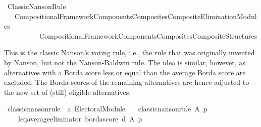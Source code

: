 %
\begin{isabellebody}%
%
%
\isadelimdocument
\isanewline
%
\endisadelimdocument
%
\isatagdocument
\isanewline
%
\isamarkuptrue%
%
\endisatagdocument
{\isafolddocument}%
%
\isadelimdocument
%
\endisadelimdocument
%
\isadelimtheory
%
\endisadelimtheory
%
\isatagtheory
{}\isamarkupfalse%
\ Classic{\isacharunderscore}{\kern0pt}Nanson{\isacharunderscore}{\kern0pt}Rule\isanewline
\ \ \ {\isachardoublequoteopen}{\isachardot}{\kern0pt}{\isachardot}{\kern0pt}{\isacharslash}{\kern0pt}Compositional{\isacharunderscore}{\kern0pt}Framework{\isacharslash}{\kern0pt}Components{\isacharslash}{\kern0pt}Composites{\isacharslash}{\kern0pt}Composite{\isacharunderscore}{\kern0pt}Elimination{\isacharunderscore}{\kern0pt}Modules{\isachardoublequoteclose}\isanewline
\ \ \ \ \ \ \ \ \ \ {\isachardoublequoteopen}{\isachardot}{\kern0pt}{\isachardot}{\kern0pt}{\isacharslash}{\kern0pt}Compositional{\isacharunderscore}{\kern0pt}Framework{\isacharslash}{\kern0pt}Components{\isacharslash}{\kern0pt}Composites{\isacharslash}{\kern0pt}Composite{\isacharunderscore}{\kern0pt}Structures{\isachardoublequoteclose}\isanewline
{}%
\endisatagtheory
{\isafoldtheory}%
%
\isadelimtheory
%
\endisadelimtheory
%
\begin{isamarkuptext}%
This is the classic Nanson's voting rule, i.e., the rule that was originally
invented by Nanson, but not the Nanson-Baldwin rule. The idea is similar,
however, as alternatives with a Borda score less or equal than the average
Borda score are excluded. The Borda scores of the remaining alternatives
are hence adjusted to the new set of (still) eligible alternatives.%
\end{isamarkuptext}\isamarkuptrue%
%
\isadelimdocument
%
\endisadelimdocument
%
\isatagdocument
%
\isamarkuptrue%
%
\endisatagdocument
{\isafolddocument}%
%
\isadelimdocument
%
\endisadelimdocument
{}\isamarkupfalse%
\ classic{\isacharunderscore}{\kern0pt}nanson{\isacharunderscore}{\kern0pt}rule\ {\isacharcolon}{\kern0pt}{\isacharcolon}{\kern0pt}\ {\isachardoublequoteopen}{\isacharprime}{\kern0pt}a\ Electoral{\isacharunderscore}{\kern0pt}Module{\isachardoublequoteclose}\ \isanewline
\ \ {\isachardoublequoteopen}classic{\isacharunderscore}{\kern0pt}nanson{\isacharunderscore}{\kern0pt}rule\ A\ p\ {\isacharequal}{\kern0pt}\isanewline
\ \ \ \ {\isacharparenleft}{\kern0pt}{\isacharparenleft}{\kern0pt}leq{\isacharunderscore}{\kern0pt}average{\isacharunderscore}{\kern0pt}eliminator\ borda{\isacharunderscore}{\kern0pt}score{\isacharparenright}{\kern0pt}\ {\isasymcirclearrowleft}\isactrlsub {\isasymexists}\isactrlsub {\isacharbang}{\kern0pt}\isactrlsub d{\isacharparenright}{\kern0pt}\ A\ p{\isachardoublequoteclose}\isanewline
%
\isadelimtheory
\isanewline
%
\endisadelimtheory
%
\isatagtheory
{}\isamarkupfalse%
%
\endisatagtheory
{\isafoldtheory}%
%
\isadelimtheory
%
\endisadelimtheory
%
\end{isabellebody}%
